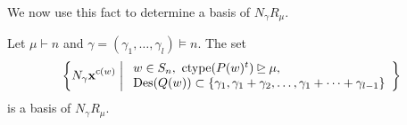 \documentclass[ALCO, Unicode]{cedram}
\DeclareMathOperator{\ctype}{ctype}
\DeclareMathOperator{\cw}{c}
\DeclareMathOperator{\des}{Des}
\begin{document}
We now use this fact to determine a basis of $N_\gamma R_{\mu}$.
\begin{prop2}
\makeatletter{}\makeatother
\label{prop:prop2}

    Let $\mu \vdash n$  and $\gamma = (\gamma_1,\dots, \gamma_l)\models n$. 
    The set
    \begin{align}\label{eq:antisym basis}
    \left\{ N_\gamma \mathbf{x}^{\cw(w)} \biggm|
    \begin{array}{l}  w \in S_n, \ \ctype(P(w)^t) \unrhd\mu, \\
      \des(Q(w)) \subset \{\gamma_1,\gamma_1 + \gamma_2, \dots, \gamma_1 + \cdots + \gamma_{l-1}\}
    \end{array}
    \right\}
    \end{align}
    is
    a basis of $N_\gamma R_{\mu}$.
\end{prop2}
\end{document}
